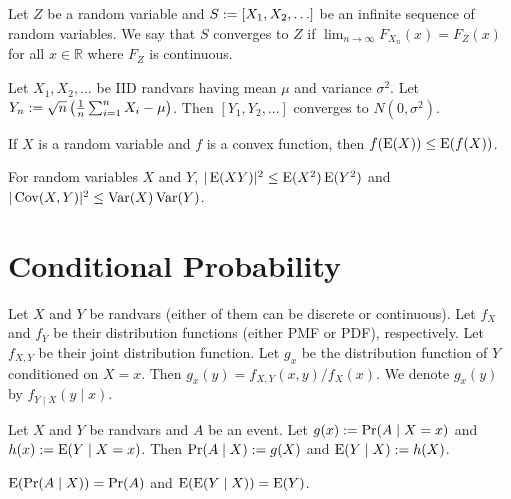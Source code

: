 \documentclass[a4paper, 12pt, fleqn]{article}
\DeclareMathOperator{\Cov}{Cov}
\begin{document}
\begin{definition}
Let $Z$ be a random variable and $S := [X_1, X_2, \ldots]$ be an infinite sequence
of random variables. We say that $S$ converges to $Z$ if
$\lim_{n \to \infty} F_{X_n}(x) = F_Z(x)$ for all $x \in \mathbb{R}$ where $F_Z$ is continuous.
\end{definition}

\begin{theorem}
Let $X_1, X_2, \ldots$ be IID randvars having mean $\mu$ and variance $\sigma^2$.
Let $Y_n := \sqrt{n}\left(\frac{1}{n}\sum_{i=1}^n X_i - \mu\right)$.
Then $[Y_1, Y_2, \ldots]$ converges to $N(0, \sigma^2)$.
\end{theorem}

\begin{theorem}
If $X$ is a random variable and $f$ is a convex function, then $f(\operatorname*{E}(X)) \le \operatorname*{E}(f(X))$.
\end{theorem}

\begin{theorem}
For random variables $X$ and $Y$, $|\operatorname*{E}(XY)|^2 \le \operatorname*{E}(X^2)\operatorname*{E}(Y^2)$
and $|\Cov(X,Y)|^2 \le \Var(X)\Var(Y)$.
\end{theorem}

\section{Conditional Probability}

\begin{theorem}
Let $X$ and $Y$ be randvars (either of them can be discrete or continuous).
Let $f_X$ and $f_Y$ be their distribution functions (either PMF or PDF), respectively.
Let $f_{X,Y}$ be their joint distribution function.
Let $g_x$ be the distribution function of $Y$ conditioned on $X=x$.
Then $g_x(y) = f_{X,Y}(x, y) / f_X(x)$.
We denote $g_x(y)$ by $f_{Y \mid X}(y \mid x)$.
\end{theorem}

\begin{definition}
Let $X$ and $Y$ be randvars and $A$ be an event.
Let $g(x) := \Pr(A \mid X=x)$ and $h(x) := \operatorname*{E}(Y \mid X=x)$.
Then $\Pr(A \mid X) := g(X)$ and $\operatorname*{E}(Y \mid X) := h(X)$.
\end{definition}

\begin{theorem}
$\operatorname*{E}(\Pr(A \mid X)) = \Pr(A)$ and $\operatorname*{E}(\operatorname*{E}(Y \mid X)) = \operatorname*{E}(Y)$.
\end{theorem}
\end{document}
